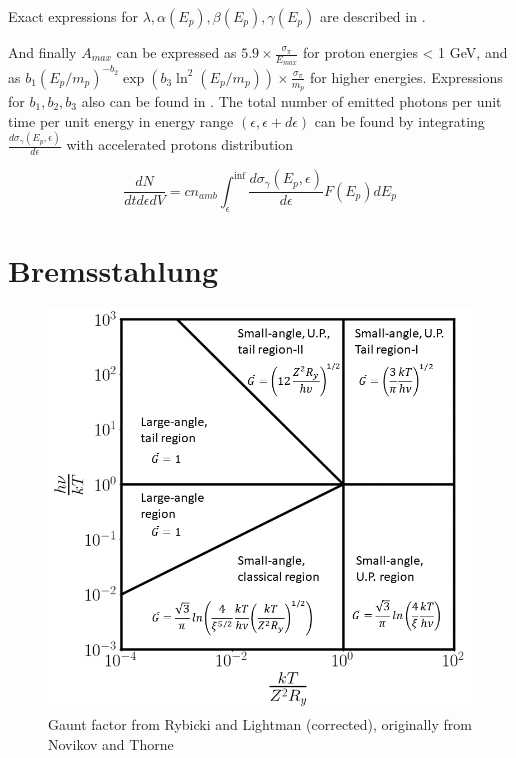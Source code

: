 Exact expressions for $\lambda, \alpha(E_p), \beta(E_p), \gamma(E_p)$ are described in \cite{Kafexhiu}.

And finally $A_{max}$ can be expressed as $5.9\times\frac{\sigma_{\pi}}{E_{max}}$ for proton energies < 1 GeV, and as $b_1 \left(E_p/m_p\right)^{-b_2}\exp\left(b_3 \ln^2\left(E_p/m_p\right)\right)\times\frac{\sigma_{\pi}}{m_p}$ for higher energies. Expressions for $b_1, b_2, b_3$ also can be found in \cite{Kafexhiu}. The total number of emitted photons per unit time per unit energy in energy range $\left(\epsilon, \epsilon + d\epsilon\right)$ can be found by integrating $\frac{d\sigma_{\gamma}\left(E_p, \epsilon\right)}{d\epsilon}$ with accelerated protons distribution

\begin{equation}
	\frac{dN}{dt d\epsilon dV} = c n_{amb} \int_{\epsilon}^{\inf}\frac{d\sigma_{\gamma}\left(E_p, \epsilon\right)}{d\epsilon} F(E_p) dE_p
\end{equation} 

\section{Bremsstahlung}

\begin{figure}
	\centering
	\includegraphics[width=12.5 cm]{./fig/gaunt.png} 
	\caption{Gaunt factor from Rybicki and Lightman \cite{Rybicki} (corrected), originally from Novikov and Thorne \cite{NovikovThorne}}
	\label{gaunt}
\end{figure}